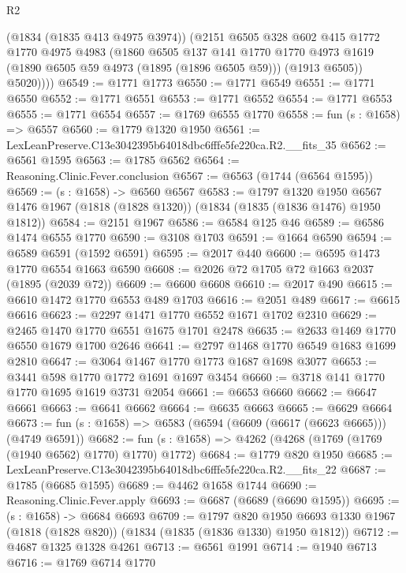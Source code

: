 \begin{lexlean}{R2}
\begin{coremodule}
          (@1834 (@1835 @413 @4975 @3974))
          (@2151
            @6505
            @328
            @602
            @415
            @1772
            @1770
            @4975
            @4983
            (@1860
              @6505
              @137
              @141
              @1770
              @1770
              @4973
              @1619
              (@1890 @6505 @59 @4973 (@1895 (@1896 @6505 @59)))
              (@1913 @6505))
            @5020))))
@6549 := @1771 @1773
@6550 := @1771 @6549
@6551 := @1771 @6550
@6552 := @1771 @6551
@6553 := @1771 @6552
@6554 := @1771 @6553
@6555 := @1771 @6554
@6557 := @1769 @6555 @1770
@6558 := fun (s : @1658) => @6557
@6560 := @1779 @1320 @1950
@6561 := LexLeanPreserve.C13e3042395b64018dbc6fffe5fe220ca.R2.__fits_35
@6562 := @6561 @1595
@6563 := @1785 @6562
@6564 := Reasoning.Clinic.Fever.conclusion
@6567 := @6563 (@1744 (@6564 @1595))
@6569 := (s : @1658) -> @6560 @6567
@6583 := @1797
    @1320
    @1950
    @6567
    @1476
    @1967
    (@1818 (@1828 @1320))
    (@1834 (@1835 (@1836 @1476) @1950 @1812))
@6584 := @2151 @1967
@6586 := @6584 @125 @46
@6589 := @6586 @1474 @6555 @1770
@6590 := @3108 @1703
@6591 := @1664 @6590
@6594 := @6589 @6591 (@1592 @6591)
@6595 := @2017 @440
@6600 := @6595 @1473 @1770 @6554 @1663 @6590
@6608 := @2026 @72 @1705 @72 @1663 @2037 (@1895 (@2039 @72))
@6609 := @6600 @6608
@6610 := @2017 @490
@6615 := @6610 @1472 @1770 @6553 @489 @1703
@6616 := @2051 @489
@6617 := @6615 @6616
@6623 := @2297 @1471 @1770 @6552 @1671 @1702 @2310
@6629 := @2465 @1470 @1770 @6551 @1675 @1701 @2478
@6635 := @2633 @1469 @1770 @6550 @1679 @1700 @2646
@6641 := @2797 @1468 @1770 @6549 @1683 @1699 @2810
@6647 := @3064 @1467 @1770 @1773 @1687 @1698 @3077
@6653 := @3441 @598 @1770 @1772 @1691 @1697 @3454
@6660 := @3718 @141 @1770 @1770 @1695 @1619 @3731 @2054
@6661 := @6653 @6660
@6662 := @6647 @6661
@6663 := @6641 @6662
@6664 := @6635 @6663
@6665 := @6629 @6664
@6673 := fun (s : @1658) => @6583 (@6594 (@6609 (@6617 (@6623 @6665))) (@4749 @6591))
@6682 := fun (s : @1658) => @4262 (@4268 (@1769 (@1769 (@1940 @6562) @1770) @1770) @1772)
@6684 := @1779 @820 @1950
@6685 := LexLeanPreserve.C13e3042395b64018dbc6fffe5fe220ca.R2.__fits_22
@6687 := @1785 (@6685 @1595)
@6689 := @4462 @1658 @1744
@6690 := Reasoning.Clinic.Fever.apply
@6693 := @6687 (@6689 (@6690 @1595))
@6695 := (s : @1658) -> @6684 @6693
@6709 := @1797
    @820
    @1950
    @6693
    @1330
    @1967
    (@1818 (@1828 @820))
    (@1834 (@1835 (@1836 @1330) @1950 @1812))
@6712 := @4687 @1325 @1328 @4261
@6713 := @6561 @1991
@6714 := @1940 @6713
@6716 := @1769 @6714 @1770

\end{coremodule}
\end{lexlean}
